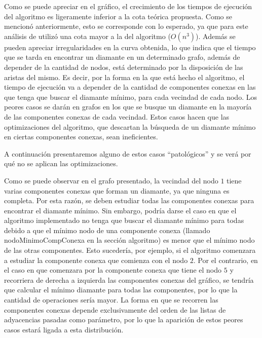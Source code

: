 \documentclass[a4paper,11pt] {article}
\begin{document}
Como se puede apreciar en el gr\'afico, el crecimiento de los tiempos de ejecuci\'on del algoritmo es ligeramente inferior a la cota te\'orica propuesta. Como se mencion\'o anteriormente, esto se corresponde con lo esperado, ya que para este an\'alisis de utiliz\'o una cota mayor a la del algoritmo ($O(n^{3})$). Adem\'as se pueden apreciar irregularidades en la curva obtenida, lo que indica que el tiempo que se tarda en encontrar un diamante en un determinado grafo, adem\'as de depender de la cantidad de nodos, est\'a determinado por la disposici\'on de las aristas del mismo. Es decir, por la forma en la que est\'a hecho el algoritmo, el tiempo de ejecuci\'on va a depender de la cantidad de componentes conexas en las que tenga que buscar el diamante m\'inimo, para cada vecindad de cada nodo. Los peores casos se dar\'an en grafos en los que se busque un diamante en la mayor\'ia de las componentes conexas de cada vecindad. Estos casos hacen que las optimizaciones del algoritmo, que descartan la b\'usqueda de un diamante m\'inimo en ciertas componentes conexas, sean ineficientes. 

A continuaci\'on presentaremos alguno de estos casos ``patol\'ogicos'' y se ver\'a por qu\'e no se aplican las optimizaciones.


Como se puede observar en el grafo presentado, la vecindad del nodo $1$ tiene varias componentes conexas que forman un diamante, ya que ninguna es completa. Por esta raz\'on, se deben estudiar todas las componentes conexas para encontrar el diamante m\'inimo. Sin embargo, podr\'ia darse el caso en que el algoritmo implementado no tenga que buscar el diamante m\'inimo para todas debido a que el m\'inimo nodo de una componente conexa (llamado nodoMinimoCompConexa en la secci\'on algoritmo) es menor que el m\'inimo nodo de las otras componentes. Esto suceder\'ia, por ejemplo, si el algoritmo comenzara a estudiar la componente conexa que comienza con el nodo $2$. Por el contrario, en el caso en que comenzara por la componente conexa que tiene el nodo $5$ y recorriera de derecha a izquierda las componentes conexas del gr\'afico, se tendr\'ia que calcular el m\'inimo diamante para todas las componentes, por lo que la cantidad de operaciones ser\'ia mayor. La forma en que se recorren las componentes conexas depende exclusivamente del orden de las listas de adyacencias pasadas como par\'ametro, por lo que la aparici\'on de estos peores casos estar\'a ligada a esta distribuci\'on. 
\end{document}
